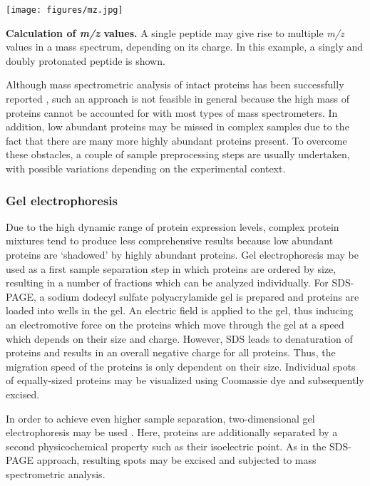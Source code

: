 \begin{SCtopfig}
\centering
\texttt{[image: figures/mz.jpg]}
\caption{
{\bf Calculation of {\em m/z} values.}
A single peptide may give rise to multiple {\em m/z} values in a mass spectrum,
    depending on its charge. In this example, a singly and doubly protonated
    peptide is shown.
} 
\label{fig:mz}
\end{SCtopfig}

Although mass spectrometric analysis of intact proteins has been successfully
reported \citep{Lee2002, Taylor2003}, such an approach is not feasible in 
general because the high mass of proteins cannot be accounted for with most
types of mass spectrometers.
In addition, low abundant proteins may be missed in complex samples due to
the fact that there are many more highly abundant proteins present.
To overcome these obstacles, a couple of sample preprocessing steps are usually
undertaken, with possible variations depending on the experimental context.

\subsubsection{Gel electrophoresis}

Due to the high dynamic range of protein expression levels, complex protein 
mixtures tend to produce less comprehensive results because low abundant 
proteins are `shadowed' by highly abundant proteins. 
Gel electrophoresis may be used as a first sample separation step in which
proteins are ordered by size, resulting in a number of fractions which can
be analyzed individually.
For SDS-PAGE, a sodium dodecyl sulfate polyacrylamide gel is prepared and
proteins are loaded into wells in the gel.
An electric field is applied to the gel, thus inducing an electromotive force 
on the proteins which move through the gel at a speed which depends on their
size and charge.
However, SDS leads to denaturation of proteins and results in an overall
negative charge for all proteins. 
Thus, the migration speed of the proteins is only dependent on their size. 
Individual spots of equally-sized proteins may be visualized using Coomassie 
dye and subsequently excised.

In order to achieve even higher sample separation, two-dimensional gel 
electrophoresis may be used \citep{Klose1975, O'Farrell1975}.
Here, proteins are additionally separated by a second physicochemical property
such as their isoelectric point.
As in the SDS-PAGE approach, resulting spots may be excised and subjected 
to mass spectrometric analysis.


